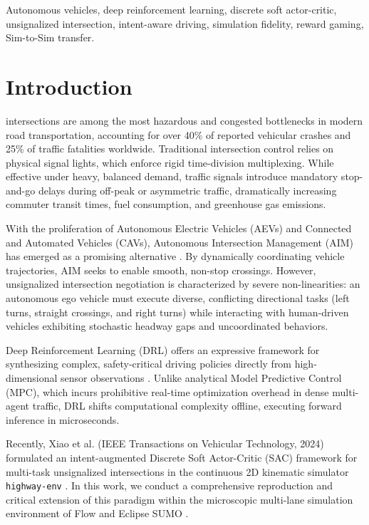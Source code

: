 \documentclass[journal]{IEEEtran}
\begin{document}
\begin{IEEEkeywords}
Autonomous vehicles, deep reinforcement learning, discrete soft actor-critic, unsignalized intersection, intent-aware driving, simulation fidelity, reward gaming, Sim-to-Sim transfer.
\end{IEEEkeywords}

\section{Introduction}
 intersections are among the most hazardous and congested bottlenecks in modern road transportation, accounting for over 40\% of reported vehicular crashes and 25\% of traffic fatalities worldwide. Traditional intersection control relies on physical signal lights, which enforce rigid time-division multiplexing. While effective under heavy, balanced demand, traffic signals introduce mandatory stop-and-go delays during off-peak or asymmetric traffic, dramatically increasing commuter transit times, fuel consumption, and greenhouse gas emissions.

With the proliferation of Autonomous Electric Vehicles (AEVs) and Connected and Automated Vehicles (CAVs), Autonomous Intersection Management (AIM) has emerged as a promising alternative \cite{dresner2008multiagent, zhong2021autonomous}. By dynamically coordinating vehicle trajectories, AIM seeks to enable smooth, non-stop crossings. However, unsignalized intersection negotiation is characterized by severe non-linearities: an autonomous ego vehicle must execute diverse, conflicting directional tasks (left turns, straight crossings, and right turns) while interacting with human-driven vehicles exhibiting stochastic headway gaps and uncoordinated behaviors.

Deep Reinforcement Learning (DRL) offers an expressive framework for synthesizing complex, safety-critical driving policies directly from high-dimensional sensor observations \cite{mnih2015human}. Unlike analytical Model Predictive Control (MPC), which incurs prohibitive real-time optimization overhead in dense multi-agent traffic, DRL shifts computational complexity offline, executing forward inference in microseconds.

Recently, Xiao et al. \cite{xiao2024decision} (IEEE Transactions on Vehicular Technology, 2024) formulated an intent-augmented Discrete Soft Actor-Critic (SAC) framework for multi-task unsignalized intersections in the continuous 2D kinematic simulator \texttt{highway-env} \cite{leurent2018highway}. In this work, we conduct a comprehensive reproduction and critical extension of this paradigm within the microscopic multi-lane simulation environment of Flow \cite{wu2017flow} and Eclipse SUMO \cite{krajzewicz2012recent}.
\end{document}
